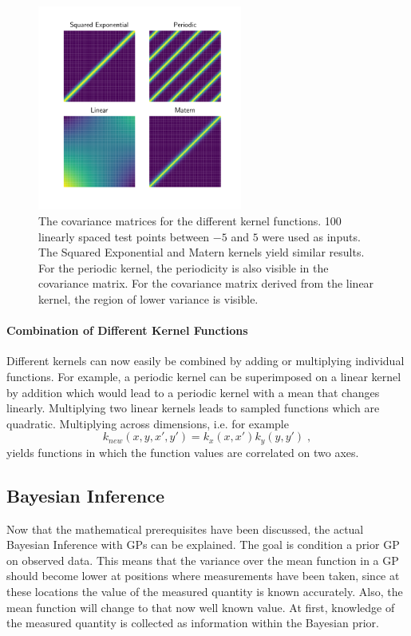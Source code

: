 \documentclass[%
  a4paper,oneside,%
  11pt,%
  smallchapters,
  style=printdev,
  extramargin,
  green,%
  rgb, <cmyk>
  ]{tubsbook}
\begin{document}
\begin{figure}[!ht]
\begin{center}
\includegraphics[width=0.6\textwidth]{pics/CovMats.pdf}
\caption{The covariance matrices for the different kernel functions. 100 linearly spaced test points between $-5$ and $5$ were used as inputs. The Squared Exponential and Matern kernels yield similar results. For the periodic kernel, the periodicity is also visible in the covariance matrix. For the covariance matrix derived from the linear kernel, the region of lower variance is visible.}
\label{fig:CovMats}
\end{center}
\end{figure}



\paragraph{Combination of Different Kernel Functions}
Different kernels can now easily be combined by adding or multiplying individual functions. For example, a periodic kernel can be superimposed on a linear kernel by addition which would lead to a periodic kernel with a mean that changes linearly. Multiplying two linear kernels leads to sampled functions which are quadratic. Multiplying across dimensions, i.e. for example
\begin{equation}
k_{new}(x,y,x',y') = k_x(x,x')k_y(y,y') \;,
\end{equation}
yields functions in which the function values are correlated on two axes. \cite{Duvenaud}

\subsection{Bayesian Inference}
Now that the mathematical prerequisites have been discussed, the actual Bayesian Inference with GPs can be explained. The goal is condition a prior GP on observed data. This means that the variance over the mean function in a GP should become lower at positions where measurements have been taken, since at these locations the value of the measured quantity is known accurately. Also, the mean function will change to that now well known value. At first, knowledge of the measured quantity is collected as information within the Bayesian prior.
\end{document}
